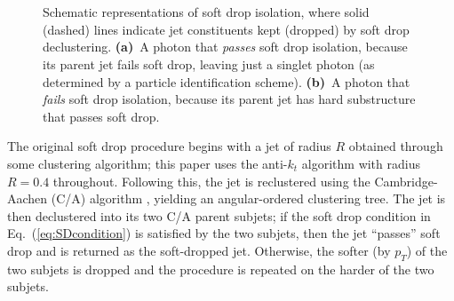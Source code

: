 \documentclass[a4paper,11pt]{article}
\newcommand{\cmark}{\ding{51}}%
\newcommand{\xmark}{\ding{55}}%
\DeclareRobustCommand{\Eq}[1]{Eq.~(\ref{#1})}
\begin{document}
\begin{figure}[t]
    \centering
    \begin{subfigure}[b]{0.47\textwidth}
    \centering
    \\[10pt]
    {\Large \color{green}\cmark}
    \caption{}
    \label{fig:sd_pass}
    \end{subfigure}
    \begin{subfigure}[b]{0.47\textwidth}
    \centering
    \\[10pt]
    {\Large \color{red}\xmark}
    \caption{}
    \label{fig:sd_fail}
    \end{subfigure}
    \caption{Schematic representations of soft drop isolation, where solid (dashed) lines indicate jet constituents kept (dropped) by soft drop declustering. \textbf{(a)}~A photon that \textit{passes} soft drop isolation, because its parent jet fails soft drop, leaving just a singlet photon (as determined by a particle identification scheme). \textbf{(b)}~A photon that \textit{fails} soft drop isolation, because its parent jet has hard substructure that passes soft drop.}
    \label{fig:sd_passfail}
\end{figure}

The original soft drop procedure begins with a jet of radius $R$ obtained through some clustering algorithm; this paper uses the anti-$k_t$ algorithm \cite{Cacciari:2008gp} with radius $R = 0.4$ throughout.
%
Following this, the jet is reclustered using the Cambridge-Aachen (C/A) algorithm \cite{Dokshitzer:1997in,Wobisch:1998wt,Wobisch:2000dk}, yielding an angular-ordered clustering tree.
%
The jet is then declustered into its two C/A parent subjets; if the soft drop condition in \Eq{eq:SDcondition} is satisfied by the two subjets, then the jet ``passes'' soft drop and is returned as the soft-dropped jet.
%
Otherwise, the softer (by $p_T$) of the two subjets is dropped and the procedure is repeated on the harder of the two subjets.
\end{document}

